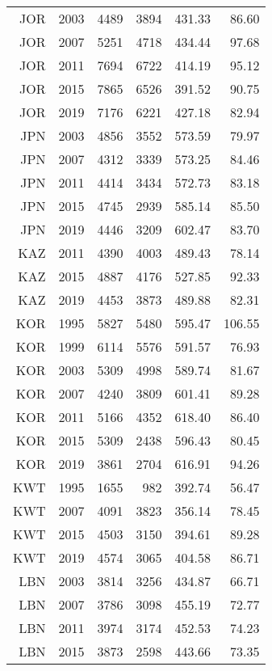 \begin{longtable}{|r|r|r|r|r|r|}
    JOR   & 2003  & 4489  & 3894  & 431.33 & 86.60 \\
    JOR   & 2007  & 5251  & 4718  & 434.44 & 97.68 \\
    JOR   & 2011  & 7694  & 6722  & 414.19 & 95.12 \\
    JOR   & 2015  & 7865  & 6526  & 391.52 & 90.75 \\
    JOR   & 2019  & 7176  & 6221  & 427.18 & 82.94 \\
    JPN   & 2003  & 4856  & 3552  & 573.59 & 79.97 \\
    JPN   & 2007  & 4312  & 3339  & 573.25 & 84.46 \\
    JPN   & 2011  & 4414  & 3434  & 572.73 & 83.18 \\
    JPN   & 2015  & 4745  & 2939  & 585.14 & 85.50 \\
    JPN   & 2019  & 4446  & 3209  & 602.47 & 83.70 \\
    KAZ   & 2011  & 4390  & 4003  & 489.43 & 78.14 \\
    KAZ   & 2015  & 4887  & 4176  & 527.85 & 92.33 \\
    KAZ   & 2019  & 4453  & 3873  & 489.88 & 82.31 \\
    KOR   & 1995  & 5827  & 5480  & 595.47 & 106.55 \\
    KOR   & 1999  & 6114  & 5576  & 591.57 & 76.93 \\
    KOR   & 2003  & 5309  & 4998  & 589.74 & 81.67 \\
    KOR   & 2007  & 4240  & 3809  & 601.41 & 89.28 \\
    KOR   & 2011  & 5166  & 4352  & 618.40 & 86.40 \\
    KOR   & 2015  & 5309  & 2438  & 596.43 & 80.45 \\
    KOR   & 2019  & 3861  & 2704  & 616.91 & 94.26 \\
    KWT   & 1995  & 1655  & 982   & 392.74 & 56.47 \\
    KWT   & 2007  & 4091  & 3823  & 356.14 & 78.45 \\
    KWT   & 2015  & 4503  & 3150  & 394.61 & 89.28 \\
    KWT   & 2019  & 4574  & 3065  & 404.58 & 86.71 \\
    LBN   & 2003  & 3814  & 3256  & 434.87 & 66.71 \\
    LBN   & 2007  & 3786  & 3098  & 455.19 & 72.77 \\
    LBN   & 2011  & 3974  & 3174  & 452.53 & 74.23 \\
    LBN   & 2015  & 3873  & 2598  & 443.66 & 73.35 \\

\end{longtable}
